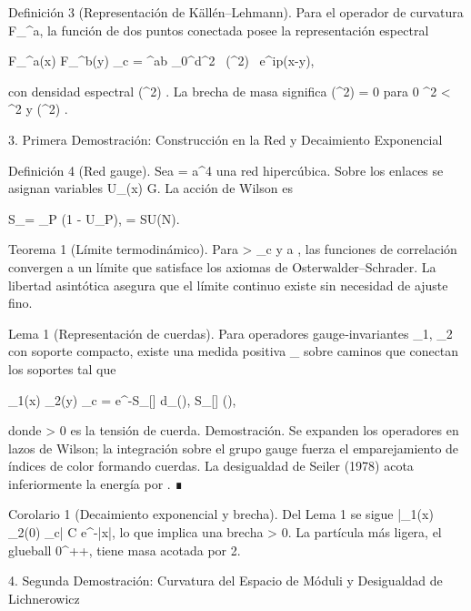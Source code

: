 \documentclass[12pt,a4paper]{book}
\begin{document}
Definición 3 (Representación de Källén–Lehmann). Para el operador de curvatura F_{\mu\nu}^a, la función de dos puntos conectada posee la representación espectral

\langle F_{\mu\nu}^a(x) F_{\rho\sigma}^b(y) \rangle_c = \delta^{ab} \int_0^\infty d\mu^2 \, \rho(\mu^2) \int {} \,  e^{ip\cdot(x-y)},

con densidad espectral \rho(\mu^2) . La brecha de masa significa \rho(\mu^2) = 0 para 0 \le \mu^2 < \Delta^2 y \rho(\Delta^2) .

3. Primera Demostración: Construcción en la Red y Decaimiento Exponencial

Definición 4 (Red gauge). Sea \Lambda = a^4 una red hipercúbica. Sobre los enlaces se asignan variables U_\mu(x) \in G. La acción de Wilson es

S_\Lambda[U] = \beta \sum_P (1 - U_P), \quad \beta =   SU(N).

Teorema 1 (Límite termodinámico). Para \beta > \beta_c y a , las funciones de correlación convergen a un límite que satisface los axiomas de Osterwalder–Schrader. La libertad asintótica asegura que el límite continuo existe sin necesidad de ajuste fino.

Lema 1 (Representación de cuerdas). Para operadores gauge‑invariantes _1, _2 con soporte compacto, existe una medida positiva \mu_{} sobre caminos \gamma que conectan los soportes tal que

\langle {}_1(x) _2(y) \rangle_c = \int e^{-S_{}[\gamma]} d\mu_{}(\gamma), \quad S_{}[\gamma] \ge \sigma \cdot {}(\gamma),

donde \sigma > 0 es la tensión de cuerda. Demostración. Se expanden los operadores en lazos de Wilson; la integración sobre el grupo gauge fuerza el emparejamiento de índices de color formando cuerdas. La desigualdad de Seiler (1978) acota inferiormente la energía por \sigma \cdot {}. ∎

Corolario 1 (Decaimiento exponencial y brecha). Del Lema 1 se sigue |\langle {}_1(x) _2(0) \rangle_c| \le C e^{-\sigma |x|}, lo que implica una brecha \Delta \ge \sigma > 0. La partícula más ligera, el glueball 0^{++}, tiene masa acotada por 2\sqrt{\sigma}.

4. Segunda Demostración: Curvatura del Espacio de Móduli y Desigualdad de Lichnerowicz
\end{document}
